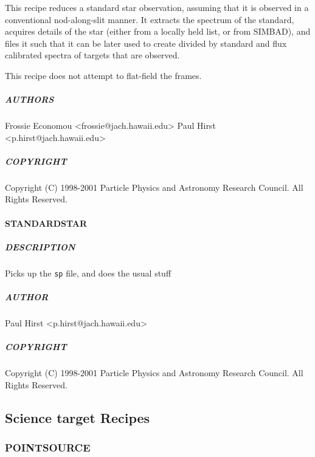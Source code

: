 \documentclass[twoside,11pt]{article}
\renewcommand{\_}{\texttt{\symbol{95}}}
\begin{document}
This recipe reduces a standard star observation, assuming that it is
observed in a conventional nod-along-slit manner. It extracts the
spectrum of the standard, acquires details of the star (either from a
locally held list, or from SIMBAD), and files it such that it can be
later used to create divided by standard and flux calibrated spectra
of targets that are observed.



This recipe does not attempt to flat-field the frames.

\subparagraph*{AUTHORS\label{STANDARD_STAR_NOFLAT_AUTHORS}}

Frossie Economou <frossie@jach.hawaii.edu>
Paul Hirst <p.hirst@jach.hawaii.edu>

\subparagraph*{COPYRIGHT\label{STANDARD_STAR_NOFLAT_COPYRIGHT}}

Copyright (C) 1998-2001 Particle Physics and Astronomy Research
Council. All Rights Reserved.

\paragraph*{\_STANDARD\_STAR\_\label{_STANDARD_STAR_}}



\subparagraph*{DESCRIPTION\label{_STANDARD_STAR__DESCRIPTION}}

Picks up the \texttt{\_sp} file, and does the usual stuff

\subparagraph*{AUTHOR\label{_STANDARD_STAR__AUTHOR}}

Paul Hirst <p.hirst@jach.hawaii.edu>

\subparagraph*{COPYRIGHT\label{_STANDARD_STAR__COPYRIGHT}}

Copyright (C) 1998-2001 Particle Physics and Astronomy Research
Council. All Rights Reserved.


\subsection{Science target Recipes}

\subsubsection{POINT\_SOURCE}
\end{document}
